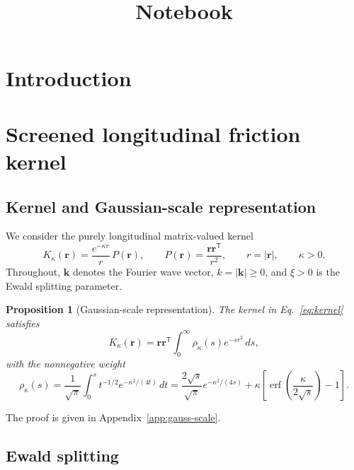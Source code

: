 \documentclass[11pt]{article}
\title{Notebook}
\author{}
\date{}
\theoremstyle{plain}
\newtheorem{proposition}{Proposition}[section]
\newcommand{\rr}{\bm r}
\newcommand{\kk}{\bm k}
\newcommand{\PP}{P}
\newcommand{\erf}{\operatorname{erf}}
\DeclareRobustCommand{\_}{\textunderscore\allowbreak}
\begin{document}
\maketitle

\section{Introduction}
\label{sec:intro}


\section{Screened longitudinal friction kernel}
\label{sec:kernel}

\subsection{Kernel and Gaussian-scale representation}

We consider the purely longitudinal matrix-valued kernel
\begin{equation}
\label{eq:kernel}
K_\kappa(\rr)
=
\frac{e^{-\kappa r}}{r}\,\PP(\rr),
\qquad
\PP(\rr)=\frac{\rr\rr^{\mathsf T}}{r^2},
\qquad
r=|\rr|,
\qquad
\kappa>0.
\end{equation}
Throughout, \(\kk\) denotes the Fourier wave vector, \(k=|\kk|\ge 0\), and
\(\xi>0\) is the Ewald splitting parameter.

\begin{proposition}[Gaussian-scale representation]
\label{prop:gauss-scale}
The kernel in Eq.~\eqref{eq:kernel} satisfies
\begin{equation}
\label{eq:gauss-scale}
K_\kappa(\rr)
=
\rr\rr^{\mathsf T}
\int_0^\infty
\rho_\kappa(s)e^{-s r^2}\,ds,
\end{equation}
with the nonnegative weight
\begin{equation}
\label{eq:rho}
\rho_\kappa(s)
=
\frac{1}{\sqrt{\pi}}
\int_0^s
t^{-1/2}
e^{-\kappa^2/(4t)}\,dt
=
\frac{2\sqrt{s}}{\sqrt{\pi}}
e^{-\kappa^2/(4s)}
+
\kappa\left[
\erf\!\left(
\frac{\kappa}{2\sqrt{s}}
\right)-1
\right].
\end{equation}
\end{proposition}

The proof is given in Appendix~\ref{app:gauss-scale}.

\subsection{Ewald splitting}
\end{document}
